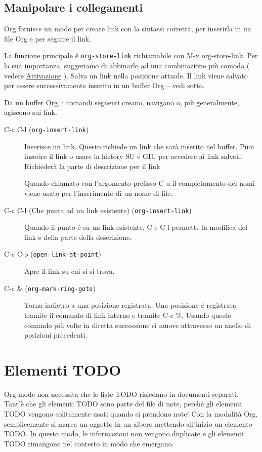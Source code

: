 \documentclass[11pt]{article}
\begin{document}
\subsection*{Manipolare i collegamenti}
\label{sec:orgea98d60}
Org fornisce un modo per creare link con la sintassi corretta, per
inserirla in un file Org e per seguire il link.

La funzione principale é \texttt{org-store-link} richiamabile con M-x org-store-link. Per la sua importanza, suggeriamo di abbinarlo ad
una combinazione più comoda ( vedere \hyperref[sec:orgb24a1ce]{Attivazione}
). Salva un link nella posizione attuale. Il link viene salvato per
essere successivamente inserito in un buffer Org -- vedi sotto.

Da un buffer Org, i comandi seguenti creano, navigano o, più
generalmente, agiscono sui link.

\begin{description}
\item[{C-c C-l (\texttt{org-insert-link})}] Inserisce un link. Questo richiede un link che sarà inserito nel
buffer. Puoi inserire il link o usare la history SU e
GIU per accedere ai link salvati. Richiederà la parte di
descrizione per il link.

Quando chiamato con l'argomento prefisso C-u il
completamento dei nomi viene usato per l'inserimento di un nome di
file.

\item[{C-c C-l (Che punta ad un link esistente) (\texttt{org-insert-link})}] Quando il punto é su un link esistente, C-c C-l permette la
modifica del link e della parte della descrizione.

\item[{C-c C-o (\texttt{open-link-at-point})}] Apre il link su cui si si trova.

\item[{C-c \& (\texttt{org-mark-ring-goto})}] Torna indietro a una posizione registrata. Una posizione é
registrata tramite il comando di link interno e tramite C-c \%. Usando questo comando più volte in diretta successione si
muove attraverso un anello di posizioni precedenti.
\end{description}

\section{Elementi TODO}
\label{sec:org57f3545}
Org mode non necessita che le liste TODO risiedano in documenti
separati. Tant'è che gli elementi TODO sono parte del file di note,
perché gli elementi TODO vengono solitamente usati quando si prendono
note! Con la modalità Org, semplicemente si marca un oggetto in un
albero mettendo all'inizio un elemento TODO. In questo modo, le
informazioni non vengono duplicate e gli elementi TODO rimangono nel
contesto in modo che emergano.
\end{document}

